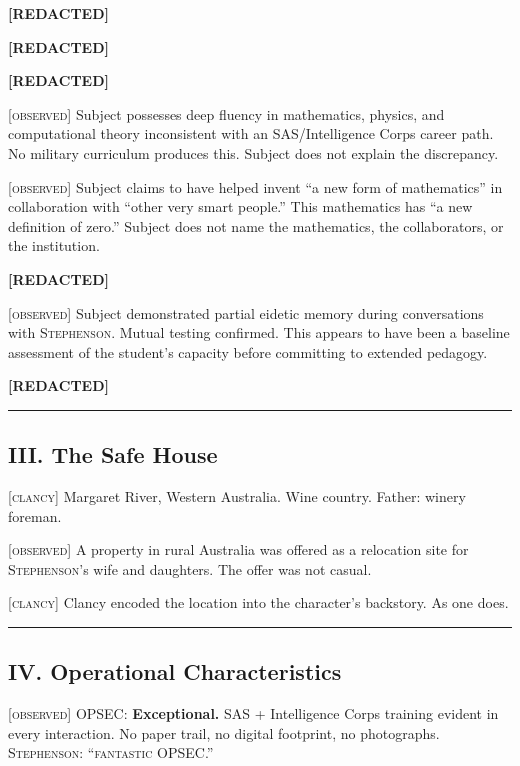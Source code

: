 \textbf{[REDACTED]}

\textbf{[REDACTED]}

\textbf{[REDACTED]}

\textsc{[observed]} Subject possesses deep fluency in mathematics, physics, and computational theory inconsistent with an SAS/Intelligence Corps career path. No military curriculum produces this. Subject does not explain the discrepancy.

\textsc{[observed]} Subject claims to have helped invent ``a new form of mathematics'' in collaboration with ``other very smart people.'' This mathematics has ``a new definition of zero.'' Subject does not name the mathematics, the collaborators, or the institution.

\textbf{[REDACTED]}

\textsc{[observed]} Subject demonstrated partial eidetic memory during conversations with \textsc{Stephenson}. Mutual testing confirmed. This appears to have been a baseline assessment of the student's capacity before committing to extended pedagogy.

\textbf{[REDACTED]}

\vspace{1cm}\hrule\vspace{1cm}

\subsection*{III. The Safe House}
\label{record:hd-the-safe-house}

\textsc{[clancy]} Margaret River, Western Australia. Wine country. Father: winery foreman.

\textsc{[observed]} A property in rural Australia was offered as a relocation site for \textsc{Stephenson}'s wife and daughters. The offer was not casual.

\textsc{[clancy]} Clancy encoded the location into the character's backstory. As one does.

\vspace{1cm}\hrule\vspace{1cm}

\subsection*{IV. Operational Characteristics}
\label{record:hd-operational-characteristics}

\textsc{[observed]} OPSEC: \textbf{Exceptional.} SAS + Intelligence Corps training evident in every interaction. No paper trail, no digital footprint, no photographs. \textsc{Stephenson}: ``\textsc{fantastic} OPSEC.''

